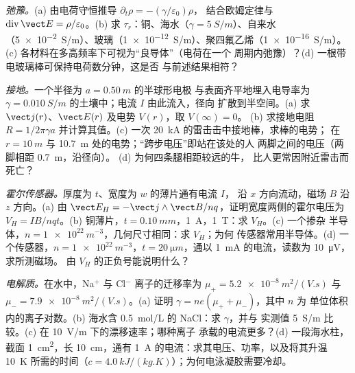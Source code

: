 \begin{exercise}[$\star\star$]\label{exo:b2:charges-currents-conduction:9}
\emph{弛豫。}(a) 由电荷守恒推导 $\partial_t\rho = -(\gamma/\varepsilon_0)\rho$，
结合欧姆定律与 $\operatorname{div}\vect E = \rho/\varepsilon_0$。(b)
求 $\tau_r$：铜、海水（$\gamma = \qty{5}{S/m}$）、自来水
（\qty{5e-2}{S/m}）、玻璃（\qty{1e-12}{S/m}）、聚四氟乙烯（\qty{1e-16}{S/m}）。(c)
各材料在多高频率下可视为“良导体”（电荷在一个
周期内弛豫）？(d) 一根带电玻璃棒可保持电荷数分钟，这是否
与前述结果相符？
\end{exercise}

\begin{exercise}[$\star\star\star$]\label{exo:b2:charges-currents-conduction:10}
\emph{接地。}一个半径为 $a = \qty{0.50}{m}$ 的半球形电极
与表面齐平地埋入电导率为 $\gamma =
\qty{0.010}{S/m}$ 的土壤中；电流 $I$ 由此流入，径向
扩散到半空间。(a) 求 $\vect j(r)$、$\vect E(r)$ 及电势 $V(r)$，取 $V(\infty) = 0$。
(b) 求接地电阻 $R = 1/2\pi\gamma a$ 并计算其值。(c) 一次
\qty{20}{kA} 的雷击击中接地棒，求棒的电势；
在 $r = \qty{10}{m}$ 与 \qty{10.7}{m} 处的电势；“跨步电压”即站在该处的人
两脚之间的电压（两脚相距 \qty{0.7}{m}，沿径向）。
(d) 为何四条腿相距较远的牛，
比人更常因附近雷击而死亡？
\end{exercise}

\begin{exercise}[$\star\star\star$]\label{exo:b2:charges-currents-conduction:11}
\emph{霍尔传感器。}厚度为 $t$、宽度为 $w$ 的薄片通有电流 $I$，
沿 $x$ 方向流动，磁场 $B$ 沿 $z$ 方向。(a) 由 $\vect E_H = -\vect j\wedge\vect B
/nq$，证明宽度两侧的霍尔电压为 $V_H = IB/nqt$。(b)
铜薄片，$t = \qty{0.10}{mm}$，\qty{1}{A}，\qty{1}{T}：求 $V_H$。(c) 一个掺杂
半导体，$n = \qty{1e22}{m^{-3}}$，几何尺寸相同：求 $V_H$；为何
传感器常用半导体。(d) 一个传感器，$n = \qty{1e22}{m^{-3}}$，$t =
\qty{20}{\micro m}$，通以 \qty{1}{mA} 的电流，读数为 \qty{10}{\micro V}，求所测磁场。
由 $V_H$ 的正负号能说明什么？
\end{exercise}

\begin{exercise}[$\star\star\star$]\label{exo:b2:charges-currents-conduction:12}
\emph{电解质。}在水中，Na$^+$ 与 Cl$^-$ 离子的迁移率为
$\mu_+ = \qty{5.2e-8}{m^2/(V.s)}$ 与 $\mu_- = \qty{7.9e-8}{m^2/(V.s)}$。(a)
证明 $\gamma = ne(\mu_+ + \mu_-)$，其中 $n$ 为
单位体积内的离子对数。(b) 海水含 \qty{0.5}{mol/L} 的 NaCl：求 $\gamma$，并与
实测值 \qty{5}{S/m} 比较。(c) 在 \qty{10}{V/m} 下的漂移速率；哪种离子
承载的电流更多？(d) 一段海水柱，截面 \qty{1}{cm^2}，长 \qty{10}{cm}，通有
\qty{1}{A} 的电流：求其电压、功率，以及将其升温 \qty{10}{K} 所需的时间（$c =
\qty{4.0}{kJ/(kg.K)}$）；为何电泳凝胶需要冷却。
\end{exercise}

